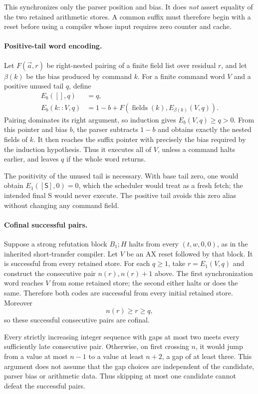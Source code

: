 This synchronizes only the parser position and bias.  It does \emph{not}
assert equality of the two retained arithmetic stores.  A common suffix
must therefore begin with a reset before using a compiler whose input
requires zero counter and cache.

\paragraph{Positive-tail word encoding.}
Let $F(\vec a,r)$ be right-nested pairing of a finite field list over
residual $r$, and let $\beta(k)$ be the bias produced by command $k$.
For a finite command word $V$ and a positive unused tail $q$, define
\[
\begin{split}
 E_b([],q)&=q,\\
 E_b(k::V,q)&=1-b+
       F(\operatorname{fields}(k),E_{\beta(k)}(V,q)).
\end{split}
\]
Pairing dominates its right argument, so induction gives
$E_b(V,q)\ge q>0$.  From this pointer and bias $b$, the parser subtracts
$1-b$ and obtains exactly the nested fields of $k$.  It then reaches
the suffix pointer with precisely the bias required by the induction
hypothesis.  Thus it executes all of $V$, unless a command halts earlier,
and leaves $q$ if the whole word returns.

The positivity of the unused tail is necessary.  With base tail zero,
one would obtain $E_1([\mathsf S],0)=0$, which the scheduler would treat
as a fresh fetch; the intended final S would never execute.  The positive
tail avoids this zero alias without changing any command field.

\paragraph{Cofinal successful pairs.}
Suppose a strong refutation block $B_1;H$ halts from every
$(t,w,0,0)$, as in the inherited short-transfer compiler.  Let $V$ be
an AX reset followed by that block.  It is successful from every retained
store.  For each $q\ge1$, take $r=E_1(V,q)$ and construct the consecutive
pair $n(r),n(r)+1$ above.  The first synchronization word reaches $V$
from some retained store; the second either halts or does the same.
Therefore both codes are successful from every initial retained store.
Moreover
\[
                           n(r)\ge r\ge q,
\]
so these successful consecutive pairs are cofinal.

Every strictly increasing integer sequence with gaps at most two meets
every sufficiently late consecutive pair.  Otherwise, on first crossing
$n$, it would jump from a value at most $n-1$ to a value at least $n+2$,
a gap of at least three.  This argument does not assume that the gap
choices are independent of the candidate, parser bias or arithmetic data.
Thus skipping at most one candidate cannot defeat the successful pairs.


